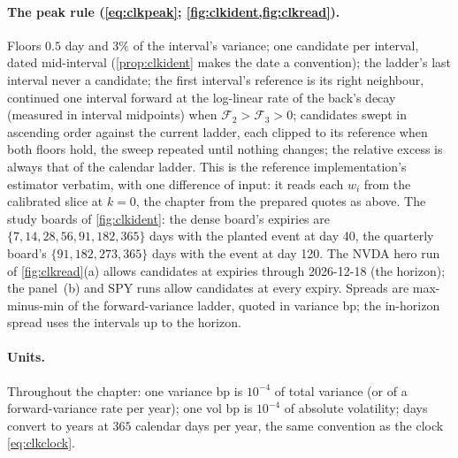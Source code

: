 \paragraph{The peak rule (\cref{eq:clkpeak};
\cref{fig:clkident,fig:clkread}).}
Floors $0.5$ day and $3\%$ of the interval's variance; one
candidate per interval, dated mid-interval
(\cref{prop:clkident} makes the date a convention); the ladder's last
interval never a candidate; the first interval's reference is its
right neighbour, continued one interval forward at the log-linear
rate of the back's decay (measured in interval midpoints) when
$\mathcal{F}_2>\mathcal{F}_3>0$; candidates swept in ascending order
against the current ladder, each clipped to its reference when both
floors hold, the sweep repeated until nothing changes; the relative
excess is always that of the calendar ladder.  This is the reference
implementation's estimator verbatim, with one difference of input:
it reads each $w_i$ from the calibrated slice at $k=0$, the chapter
from the prepared quotes as above.  The study boards of
\cref{fig:clkident}: the dense board's expiries
are $\{7,14,28,56,91,182,365\}$ days with the planted event at day
40, the quarterly board's $\{91,182,273,365\}$ days with the event
at day 120.  The NVDA hero run of \cref{fig:clkread}(a) allows
candidates at expiries through 2026-12-18 (the horizon); the
panel~(b) and SPY runs allow candidates at every expiry.  Spreads
are max-minus-min of the forward-variance ladder, quoted in variance
bp; the in-horizon spread uses the intervals up to the horizon.

\paragraph{Units.}
Throughout the chapter: one variance bp is $10^{-4}$ of total
variance (or of a forward-variance rate per year); one vol bp is
$10^{-4}$ of absolute volatility; days convert to years at
$365$ calendar days per year, the same convention as the clock
\eqref{eq:clkclock}.
